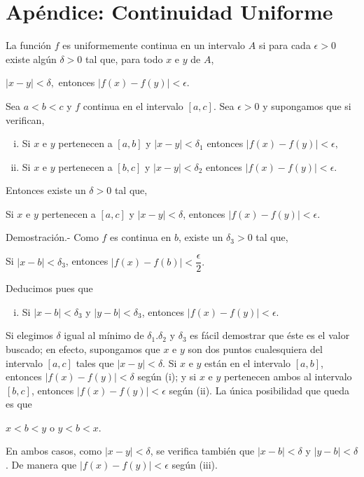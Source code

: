\begin{enumerate}[\bfseries 1.]
\begin{enumerate}[(a)]
	\end{enumerate}

\end{enumerate}

\section{Apéndice: Continuidad Uniforme}

\begin{tcolorbox}
    \begin{def.}
	La función $f$ es uniformemente continua en un intervalo $A$ si para cada $\epsilon>0$ existe algún $\delta>0$ tal que, para todo $x$ e $y$ de $A$,
	\begin{center}
	    $|x-y|<\delta,$ entonces $|f(x)-f(y)|<\epsilon.$
	\end{center}
    \end{def.}
\end{tcolorbox}

\begin{lema}
    Sea $a<b<c$ y $f$ continua en el intervalo $[a,c]$. Sea $\epsilon>0$ y supongamos que si verifican,
    \begin{enumerate}[(i)]
	\item Si $x$ e $y$ pertenecen a $[a,b]$ y $|x-y|<\delta_1$ entonces $|f(x)-f(y)|<\epsilon,$
	\item Si $x$ e $y$ pertenecen a $[b,c]$ y $|x-y|<\delta_2$ entonces $|f(x)-f(y)|<\epsilon.$
    \end{enumerate}
    Entonces existe un $\delta>0$ tal que,
    \begin{center}
	Si $x$ e $y$ pertenecen a $[a,c]$ y $|x-y|<\delta$, entonces $|f(x)-f(y)|<\epsilon.$
    \end{center}
    \vspace{.7cm}
	Demostración.-\; Como $f$ es continua en $b$, existe un $\delta_3>0$ tal que,
	\begin{center}
	    Si $|x-b|<\delta_3$, entonces $|f(x)-f(b)|<\dfrac{\epsilon}{2}.$
	\end{center}
	Deducimos pues que
	\begin{enumerate}[iii)]
	    \item Si $|x-b|<\delta_3$ y $|y-b|<\delta_3$, entonces $|f(x)-f(y)|<\epsilon.$
	\end{enumerate}
	Si elegimos $\delta$ igual al mínimo de $\delta_1.\delta_2$ y $\delta_3$ es fácil demostrar que éste es el valor buscado; en efecto, supongamos que $x$ e $y$ son dos puntos cualesquiera del intervalo $[a,c]$ tales que $|x-y|<\delta$. Si $x$ e $y$ están en el intervalo $[a,b]$, entonces $|f(x)-f(y)|<\delta$ según (i); y si $x$ e $y$ pertenecen ambos al intervalo $[b,c]$, entonces $|f(x)-f(y)|<\epsilon$ según (ii). La única posibilidad que queda es que 
	\begin{center}
	    $x<b<y$ o $y<b<x.$
	\end{center}
	En ambos casos, como $|x-y|<\delta$, se verifica también que $|x-b|<\delta$ y $|y-b|<\delta$. De manera que $|f(x)-f(y)|<\epsilon$ según (iii).\\\\
\end{lema}

